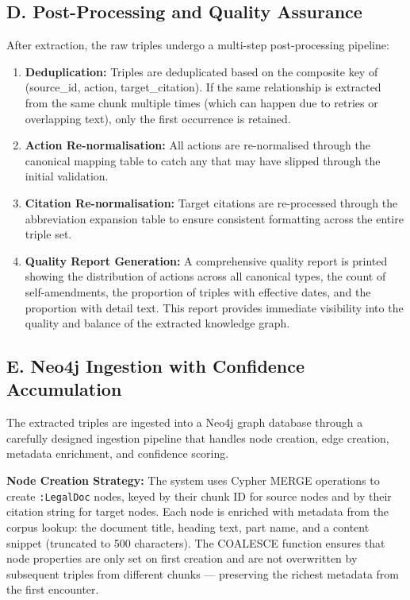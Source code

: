\documentclass[10pt, a4paper, twocolumn]{article}
\begin{document}
\subsection{D. Post-Processing and Quality Assurance}
After extraction, the raw triples undergo a multi-step post-processing pipeline:

\begin{enumerate}
    \item \textbf{Deduplication:} Triples are deduplicated based on the composite key of (source\_id, action, target\_citation). If the same relationship is extracted from the same chunk multiple times (which can happen due to retries or overlapping text), only the first occurrence is retained.
    \item \textbf{Action Re-normalisation:} All actions are re-normalised through the canonical mapping table to catch any that may have slipped through the initial validation.
    \item \textbf{Citation Re-normalisation:} Target citations are re-processed through the abbreviation expansion table to ensure consistent formatting across the entire triple set.
    \item \textbf{Quality Report Generation:} A comprehensive quality report is printed showing the distribution of actions across all canonical types, the count of self-amendments, the proportion of triples with effective dates, and the proportion with detail text. This report provides immediate visibility into the quality and balance of the extracted knowledge graph.
\end{enumerate}

\subsection{E. Neo4j Ingestion with Confidence Accumulation}
The extracted triples are ingested into a Neo4j graph database through a carefully designed ingestion pipeline that handles node creation, edge creation, metadata enrichment, and confidence scoring.

\textbf{Node Creation Strategy:} The system uses Cypher MERGE operations to create \texttt{:LegalDoc} nodes, keyed by their chunk ID for source nodes and by their citation string for target nodes. Each node is enriched with metadata from the corpus lookup: the document title, heading text, part name, and a content snippet (truncated to 500 characters). The COALESCE function ensures that node properties are only set on first creation and are not overwritten by subsequent triples from different chunks — preserving the richest metadata from the first encounter.
\end{document}
